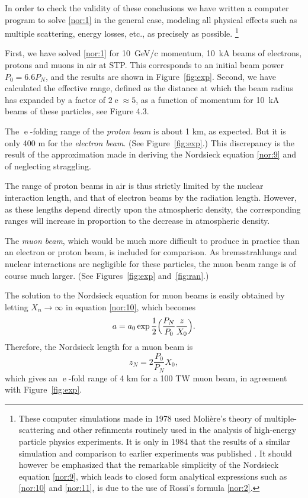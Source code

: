 \documentclass [12pt,a4paper,     ]{report} %
\newcommand{\e  }{\operatorname{e}}   %
\begin{document}
	In order to check the validity of these conclusions we have written a computer program to solve \eqref{nor:1} in the general case, modeling all physical effects such as multiple scattering, energy losses, etc., as precisely as possible. \footnote{These computer simulations made in 1978 used Moli\`ere's theory of multiple-scattering and other refinments routinely used in the analysis of high-energy particle physics experiments.  It is only in 1984 that the results of a similar simulation and comparison to earlier experiments was published \cite{HUGHE1984-}. It should however be emphasized that the remarkable simplicity of the Nordsieck equation \eqref{nor:9}, which leads to closed form analytical expressions such as \eqref{nor:10} and \eqref{nor:11}, is due to the use of Rossi's formula \eqref{nor:2}.}

   First, we have solved \eqref{nor:1} for 10~GeV/c momentum, 10~kA beams of electrons, protons and muons in air at STP.  This corresponds to an initial beam power $P_0 = 6.6 P_N$, and the results are shown in Figure~\ref{fig:exp}.  Second, we have calculated the effective range, defined as the distance at which the beam radius has expanded by a factor of $2\e\approx 5$, as a function of momentum for 10~kA beams of these particles, see Figure 4.3.

   The $\e$-folding range of the \emph{proton beam} is about 1 km, as expected.  But it is only 400 m for the \emph{electron beam}.  (See Figure~\ref{fig:exp}.)  This discrepancy is the result of the approximation made in deriving the Nordsieck equation \eqref{nor:9} and of neglecting straggling.

   The range of proton beams in air is thus strictly limited by the nuclear interaction length, and that of electron beams by the radiation length.  However, as these lengths depend directly upon the atmospheric density, the corresponding ranges will increase in proportion to the decrease in atmospheric density.

   The \emph{muon beam}, which would be much more difficult to produce in practice than an electron or proton beam, is included for comparison.  As bremsstrahlungs and nuclear interactions are negligible for these particles, the muon beam range is of course much larger.  (See Figures~\ref{fig:exp} and~\ref{fig:ran}.)

   The solution to the Nordsieck equation for muon beams is easily obtained by letting $X_n \rightarrow \infty$ in equation \eqref{nor:10}, which becomes
%
\begin{equation}\label{nor:13} %
    a = a_0 \exp  \frac{1}{2} \Bigl( \frac{P_N}{P_0} \frac{z}{X_0} \Bigr).
\end{equation}
%
Therefore, the Nordsieck length for a muon beam is 
%
\begin{equation}\label{nor:14} %
    z_N = 2 \frac{P_0}{P_N} X_0,
\end{equation}
%
which gives an $\e$-fold range of 4 km for a 100 TW muon beam, in agreement with Figure~\ref{fig:exp}.
\end{document}
